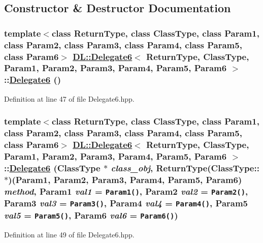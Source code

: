 \subsection{Constructor \& Destructor Documentation}
\hypertarget{classDL_1_1Delegate6_d0}{
\subsubsection[Delegate6]{\setlength{\rightskip}{0pt plus 5cm}template$<$class Return\-Type, class Class\-Type, class Param1, class Param2, class Param3, class Param4, class Param5, class Param6$>$ \hyperlink{classDL_1_1Delegate6}{DL::Delegate6}$<$ Return\-Type, Class\-Type, Param1, Param2, Param3, Param4, Param5, Param6 $>$::\hyperlink{classDL_1_1Delegate6}{Delegate6} ()}}
\label{classDL_1_1Delegate6_d0}




Definition at line 47 of file Delegate6.hpp.\hypertarget{classDL_1_1Delegate6_a0}{
\subsubsection[Delegate6]{\setlength{\rightskip}{0pt plus 5cm}template$<$class Return\-Type, class Class\-Type, class Param1, class Param2, class Param3, class Param4, class Param5, class Param6$>$ \hyperlink{classDL_1_1Delegate6}{DL::Delegate6}$<$ Return\-Type, Class\-Type, Param1, Param2, Param3, Param4, Param5, Param6 $>$::\hyperlink{classDL_1_1Delegate6}{Delegate6} (Class\-Type $\ast$ {\em class\_\-obj}, Return\-Type(Class\-Type::$\ast$)(Param1, Param2, Param3, Param4, Param5, Param6) {\em method}, Param1 {\em val1} = {\tt Param1()}, Param2 {\em val2} = {\tt Param2()}, Param3 {\em val3} = {\tt Param3()}, Param4 {\em val4} = {\tt Param4()}, Param5 {\em val5} = {\tt Param5()}, Param6 {\em val6} = {\tt Param6()})}}
\label{classDL_1_1Delegate6_a0}




Definition at line 49 of file Delegate6.hpp.

